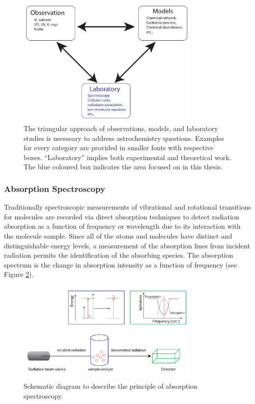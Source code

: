 \begin{figure}[!htb]
    \centering
    \includegraphics[width=0.8\textwidth]{figures/intro/astrochemistry-flow-chart.pdf}

    \caption{The triangular approach of observations, models, and laboratory studies is necessary to address astrochemistry questions. Examples for every category are provided in smaller fonts with respective boxes. \enquote{Laboratory} implies both experimental and theoretical work. The blue coloured box indicates the area focused on in this thesis.}
    \label{fig:astrochemistry-flow-chart}

\end{figure}

\subsubsection*{Absorption Spectroscopy}

Traditionally spectroscopic measurements of vibrational and rotational
transitions for molecules are recorded via direct absorption techniques to
detect radiation absorption as a function of frequency or wavelength due to its
interaction with the molecule sample. Since all of the atoms and molecules have
distinct and distinguishable energy levels, a measurement of the absorption
lines from incident radiation permits the identification of the absorbing
species. The absorption spectrum is the change in absorption intensity as a
function of frequency (see Figure \ref{fig:absorption_spectroscopy}).\\

\begin{figure}[!htb]
    \centering
    \includegraphics[width=0.8\textwidth]{figures/intro/Absorption.png}
    \caption{Schematic diagram to describe the principle of absorption spectroscopy.}
    \label{fig:absorption_spectroscopy}
\end{figure}

